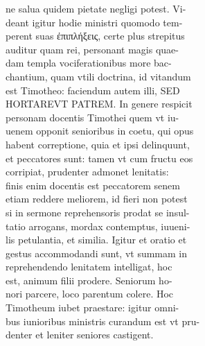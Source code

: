 \documentclass{article}
\begin{document}
\begin{pages}
                ne salua quidem pietate negligi potest. Vi- \\
                deant igitur hodie ministri quomodo tem- \\
                perent suas ἐπιπλήξεις, certe plus strepitus \\
                auditur quam rei, personant magis quae- \\
                dam templa vociferationibus more bac- \\
                chantium, quam vtili doctrina, id vitandum \\
                est Timotheo: faciendum autem illi, SED \\
                HORTAREVT PATREM. In genere respicit \\
                personam docentis Timothei quem vt iu- \\
                uenem opponit senioribus in coetu, qui opus \\
                habent correptione, quia et ipsi delinquunt, \\
                et peccatores sunt: tamen vt cum fructu eos \\
                corripiat, prudenter admonet lenitatis: \\
                finis enim docentis est peccatorem senem \\
                etiam reddere meliorem, id fieri non potest \\
                si in sermone reprehensoris prodat se insul- \\
                tatio arrogans, mordax contemptus, iuueni- \\
                lis petulantia, et similia. Igitur et oratio et \\
                gestus accommodandi sunt, vt summam in \\
                reprehendendo lenitatem intelligat, hoc \\
                est, animum filii prodere. Seniorum ho- \\
                nori parcere, loco parentum colere. Hoc \\
                Timotheum iubet praestare: igitur omni- \\
                bus iunioribus ministris curandum est vt pru- \\
                denter et leniter seniores castigent. \\

\end{pages}
\end{document}
